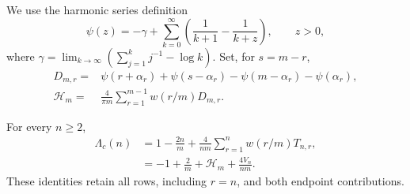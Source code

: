 We use the harmonic series definition
\begin{equation}\label{eq:corner-psi-definition}
 \psi(z)=-\gamma+\sum_{k=0}^{\infty}
       \left(\frac1{k+1}-\frac1{k+z}\right),\qquad z>0,
\end{equation}
where $\gamma=\lim_{k\to\infty}(\sum_{j=1}^k j^{-1}-\log k)$.
Set, for $s=m-r$,
\begin{align}
 D_{m,r}={}&\psi(r+\alpha_r)+\psi(s-\alpha_r)
                  -\psi(m-\alpha_r)-\psi(\alpha_r),
 \label{eq:corner-harmonic-row}\\
 \mathcal H_m={}&\frac4{\pi m}\sum_{r=1}^{m-1}w(r/m)D_{m,r}.
 \label{eq:corner-harmonic-triangle}
\end{align}

\begin{proposition}
\label{prop:corner-harmonic-decomposition}
For every $n\geq2$,
\begin{align}
 \Lambda_c(n)&=1-\frac{2n}{m}
             +\frac4{nm}\sum_{r=1}^n w(r/m)T_{n,r},
             \label{eq:corner-cotangent-decomposition}\\
 &= -1+\frac2m+\mathcal H_m+\frac{4V_n}{nm}.
             \label{eq:corner-exact-decomposition}
\end{align}
These identities retain all rows, including $r=n$, and both endpoint
contributions.
\end{proposition}


